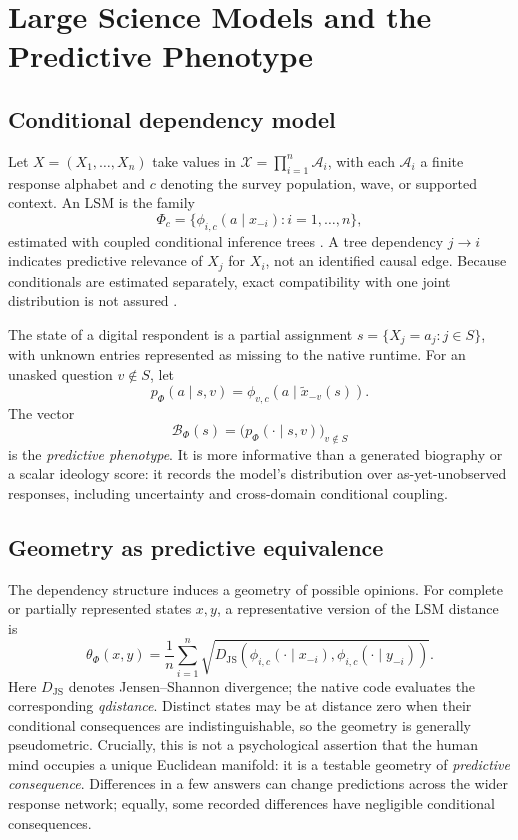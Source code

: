 \documentclass[journal,10pt]{IEEEtran}
\newcommand{\calB}{\mathcal{B}}
\newcommand{\calX}{\mathcal{X}}
\newcommand{\JS}{D_{\mathrm{JS}}}
\newcommand{\Ph}{\Phi}
\begin{document}
\section{Large Science Models and the Predictive Phenotype}
\subsection{Conditional dependency model}
Let $X=(X_1,\ldots,X_n)$ take values in $\calX=\prod_{i=1}^n\mathcal A_i$, with each $\mathcal A_i$ a finite response alphabet and $c$ denoting the survey population, wave, or supported context. An LSM is the family
\begin{equation}
\Ph_c=\{\phi_{i,c}(a\mid x_{-i}) : i=1,\ldots,n\},
\label{eq:lsm}
\end{equation}
estimated with coupled conditional inference trees \cite{hothorn2006,sizemore2024,dahal2026}. A tree dependency $j\to i$ indicates predictive relevance of $X_j$ for $X_i$, not an identified causal edge. Because conditionals are estimated separately, exact compatibility with one joint distribution is not assured \cite{heckerman2000}.

The state of a digital respondent is a partial assignment $s=\{X_j=a_j:j\in S\}$, with unknown entries represented as missing to the native runtime. For an unasked question $v\notin S$, let
\begin{equation}
p_\Ph(a\mid s,v)=\phi_{v,c}(a\mid\widetilde x_{-v}(s)).
\label{eq:predict}
\end{equation}
The vector
\begin{equation}
\calB_\Ph(s)=\bigl(p_\Ph(\cdot\mid s,v)\bigr)_{v\notin S}
\label{eq:beliefstate}
\end{equation}
is the \emph{predictive phenotype}. It is more informative than a generated biography or a scalar ideology score: it records the model's distribution over as-yet-unobserved responses, including uncertainty and cross-domain conditional coupling.

\subsection{Geometry as predictive equivalence}
The dependency structure induces a geometry of possible opinions. For complete or partially represented states $x,y$, a representative version of the LSM distance is
\begin{equation}
\theta_\Ph(x,y)=\frac{1}{n}\sum_{i=1}^n
\sqrt{\JS\!\left(
\phi_{i,c}(\cdot\mid x_{-i}),\phi_{i,c}(\cdot\mid y_{-i})
\right)}.
\label{eq:metric}
\end{equation}
Here $\JS$ denotes Jensen--Shannon divergence; the native code evaluates the corresponding \emph{qdistance}. Distinct states may be at distance zero when their conditional consequences are indistinguishable, so the geometry is generally pseudometric. Crucially, this is not a psychological assertion that the human mind occupies a unique Euclidean manifold: it is a testable geometry of \emph{predictive consequence}. Differences in a few answers can change predictions across the wider response network; equally, some recorded differences have negligible conditional consequences.
\end{document}
